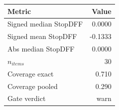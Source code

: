 \begin{tabular}{lr}
\toprule
Metric & Value \\
\midrule
Signed median StopDFF & 0.0000 \\
Signed mean StopDFF & -0.1333 \\
Abs median StopDFF & 0.0000 \\
$n_{items}$ & 30 \\
Coverage exact & 0.710 \\
Coverage pooled & 0.290 \\
Gate verdict & warn \\
\bottomrule
\end{tabular}